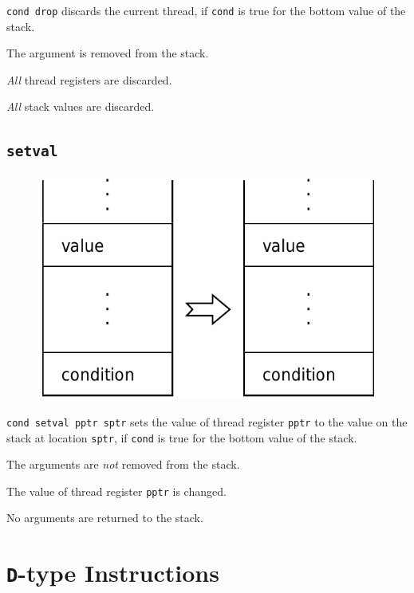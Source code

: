 			\texttt{cond drop} discards the current thread, if \texttt{cond} is
			true for the bottom value of the stack.
			
			The argument is removed from the stack.
			
			\emph{All} thread registers are discarded.
			
			\emph{All} stack values are discarded.
	
	\qquad

	\subsection*{\texttt{setval}}
	
		\begin{figure}
			\begin{flushright}
				\includegraphics[width=\linewidth]{figure/pdf/i_setval} 
			\end{flushright}
		\end{figure}
	
			\texttt{cond setval pptr sptr} sets the value of thread register
			\texttt{pptr} to the value on the stack at location \texttt{sptr}, 
			if \texttt{cond} is true for the bottom value of the stack.
			
			The arguments are \emph{not} removed from the stack.
			
			The value of thread register \texttt{pptr} is changed.
			
			No arguments are returned to the stack.
	
	\qquad

\section{\texttt{D}-type Instructions}

